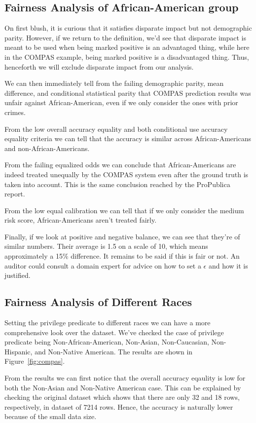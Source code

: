 \documentclass[conference]{IEEEtran}
\begin{document}
\subsection{Fairness Analysis of African-American group}
On first blush, it is curious that it satisfies disparate impact but not demographic parity. However, if we return to the definition, we'd see that disparate impact is meant to be used when being marked positive is an advantaged thing, while here in the COMPAS example, being marked positive is a disadvantaged thing. Thus, henceforth we will exclude disparate impact from our analysis.

We can then immediately tell from the failing demographic parity, mean difference, and conditional statistical parity that COMPAS prediction results was unfair against African-American, even if we only consider the ones with prior crimes.

From the low overall accuracy equality and both conditional use accuracy equality criteria we can tell that the accuracy is similar across African-Americans and non-African-Americans.

From the failing equalized odds we can conclude that African-Americans are indeed treated unequally by the COMPAS system even after the ground truth is taken into account. This is the same conclusion reached by the ProPublica report.

From the low equal calibration we can tell that if we only consider the medium risk score, African-Americans aren't treated fairly.

Finally, if we look at positive and negative balance, we can see that they're of similar numbers. Their average is 1.5 on a scale of 10, which means approximately a 15\% difference. It remains to be said if this is fair or not. An auditor could consult a domain expert for advice on how to set a $\epsilon$ and how it is justified.

\subsection{Fairness Analysis of Different Races}
Setting the privilege predicate to different races we can have a more comprehensive look over the dataset. We've checked the case of privilege predicate being Non-African-American, Non-Asian, Non-Caucasian, Non-Hispanic, and Non-Native American. The results are shown in Figure~\ref{fig:compas}.

From the results we can first notice that the overall accuracy eqaulity is low for both the Non-Asian and Non-Native American case. This can be explained by checking the original dataset which shows that there are only 32 and 18 rows, respectively, in dataset of 7214 rows. Hence, the accuracy is naturally lower because of the small data size.
\end{document}

